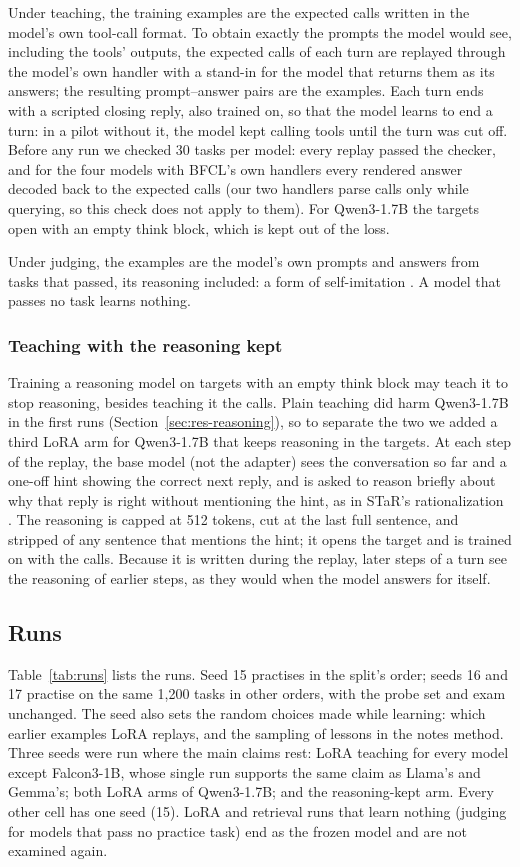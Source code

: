 \documentclass[a4paper,fleqn]{cas-dc}
\begin{document}
Under teaching, the training examples are the expected calls written in the model's own tool-call format. To obtain
exactly the prompts the model would see, including the tools' outputs, the expected calls of each turn are replayed
through the model's own handler with a stand-in for the model that returns them as its answers; the resulting prompt--answer pairs are
the examples. Each turn ends with a scripted closing reply, also trained on, so that the model learns to end a turn: in
a pilot without it, the model kept calling tools until the turn was cut off. Before any run we checked 30 tasks per
model: every replay passed the checker, and for the four models with BFCL's own handlers every rendered answer decoded
back to the expected calls (our two handlers parse calls only while querying, so this check does not apply to them). For Qwen3-1.7B the
targets open with an empty think block, which is kept out of the loss.

Under judging, the examples are the model's own prompts and answers from tasks that passed, its reasoning included: a
form of self-imitation \citep{oh2018self,zelikman2022star}. A model that passes no task learns nothing.

\subsubsection{Teaching with the reasoning kept}
Training a reasoning model on targets with an empty think block may teach it to stop reasoning, besides teaching it the
calls. Plain teaching did harm Qwen3-1.7B in the first runs (Section~\ref{sec:res-reasoning}), so to separate the two we added
a third LoRA arm for Qwen3-1.7B that keeps reasoning in the targets. At each step of the replay,
the base model (not the adapter) sees the conversation so far and a one-off hint showing the correct next reply, and is
asked to reason briefly about why that reply is right without mentioning the hint, as in STaR's rationalization
\citep{zelikman2022star}. The reasoning is capped at 512 tokens, cut at the last full sentence, and stripped of any
sentence that mentions the hint; it opens the target and is trained on with the calls. Because it is written during the
replay, later steps of a turn see the reasoning of earlier steps, as they would when the model answers for itself.

\subsection{Runs}\label{sec:runs}
Table~\ref{tab:runs} lists the runs. Seed 15 practises in the split's order; seeds 16 and 17 practise on the same 1,200
tasks in other orders, with the probe set and exam unchanged. The seed also sets the random choices made while learning:
which earlier examples LoRA replays, and the sampling of lessons in the notes method. Three seeds were run where the main claims rest: LoRA teaching
for every model except Falcon3-1B, whose single run supports the same claim as Llama's and Gemma's; both LoRA arms of
Qwen3-1.7B; and the reasoning-kept arm. Every other cell has one seed (15). LoRA and retrieval runs that learn nothing
(judging for models that pass no practice task) end as the frozen model and are not examined again.
\end{document}
